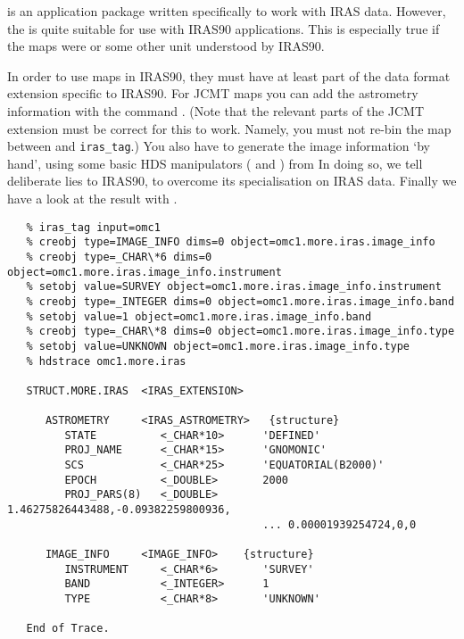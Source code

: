    is an application package written specifically to work with IRAS
   data. However, the
   is quite suitable for use
   with IRAS90 applications. This is especially true if the maps were
   or some other unit understood by IRAS90.

   In order to use maps in IRAS90, they must have at least part
   of the data format extension specific to IRAS90. For JCMT maps you
   can add the astrometry information with the command
{\tt {}}.
   (Note that the relevant parts of the JCMT extension must be correct
   for this to work. Namely, you must not re-bin the map between
{\tt {}}
   and {\tt iras\_tag}.) You also have to generate the image information
   `by hand', using some basic HDS manipulators
({\tt {}}
   and
{\tt {}})
   from
   In doing so, we tell deliberate lies to IRAS90, to overcome its
   specialisation on IRAS data. Finally we have a look at the result with
{\tt {}}.

\begin{verbatim}
   % iras_tag input=omc1
   % creobj type=IMAGE_INFO dims=0 object=omc1.more.iras.image_info
   % creobj type=_CHAR\*6 dims=0 object=omc1.more.iras.image_info.instrument
   % setobj value=SURVEY object=omc1.more.iras.image_info.instrument
   % creobj type=_INTEGER dims=0 object=omc1.more.iras.image_info.band
   % setobj value=1 object=omc1.more.iras.image_info.band
   % creobj type=_CHAR\*8 dims=0 object=omc1.more.iras.image_info.type
   % setobj value=UNKNOWN object=omc1.more.iras.image_info.type
   % hdstrace omc1.more.iras

   STRUCT.MORE.IRAS  <IRAS_EXTENSION>

      ASTROMETRY     <IRAS_ASTROMETRY>   {structure}
         STATE          <_CHAR*10>      'DEFINED'
         PROJ_NAME      <_CHAR*15>      'GNOMONIC'
         SCS            <_CHAR*25>      'EQUATORIAL(B2000)'
         EPOCH          <_DOUBLE>       2000
         PROJ_PARS(8)   <_DOUBLE>       1.46275826443488,-0.09382259800936,
                                        ... 0.00001939254724,0,0

      IMAGE_INFO     <IMAGE_INFO>    {structure}
         INSTRUMENT     <_CHAR*6>       'SURVEY'
         BAND           <_INTEGER>      1
         TYPE           <_CHAR*8>       'UNKNOWN'

   End of Trace.
\end{verbatim}

